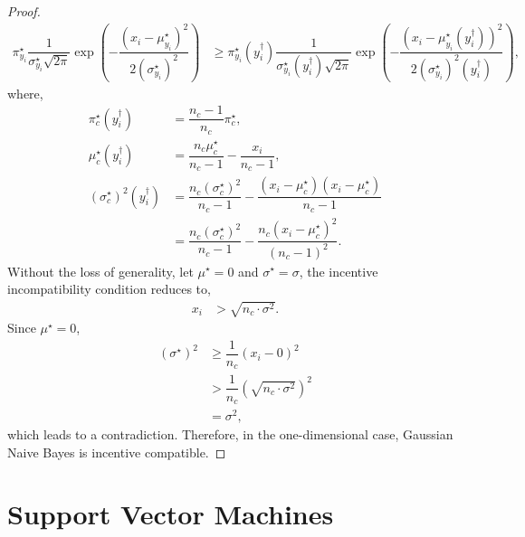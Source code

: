 \documentclass{article}
\begin{document}
\begin{proof}
\begin{align*}
\pi^\star _{y_{i}} \dfrac{1}{\sigma^\star _{y_{i}} \sqrt{2 \pi}} \exp\left(- \dfrac{\left(x_{i} - \mu^\star _{y_{i}}\right)^{2}}{2 \left(\sigma^\star _{y_{i}}\right)^{2}}\right) &\geq   \pi^\star _{y_{i}}\left(y^{\dagger}_{i}\right) \dfrac{1}{\sigma^\star _{y_{i}}\left(y^{\dagger}_{i}\right) \sqrt{2 \pi}} \exp\left(- \dfrac{\left(x_{i} - \mu^\star _{y_{i}}\left(y^{\dagger}_{i}\right)\right)^{2}}{2 \left(\sigma^\star _{y_{i}}\right)^{2}\left(y^{\dagger}_{i}\right)}\right),
\end{align*}
where,
\begin{align*}
\pi^\star _{c}\left(y^{\dagger}_{i}\right) &= \dfrac{n_{c} - 1}{n_{c}} \pi^\star _{c} ,
\\ \mu^\star _{c}\left(y^{\dagger}_{i}\right) &= \dfrac{n_{c} \mu^\star _{c}}{n_{c} - 1} - \dfrac{x_{i}}{n_{c} - 1} ,
\\ \left(\sigma^\star _{c}\right)^{2}\left(y^{\dagger}_{i}\right) &= \dfrac{n_{c} \left(\sigma^\star _{c}\right)^{2}}{n_{c} - 1} - \dfrac{\left(x_{i} - \mu^\star _{c}\right) \left(x_{i} - \mu^\star _{c}\right)}{n_{c} - 1}
\\ &= \dfrac{n_{c} \left(\sigma^\star _{c}\right)^{2}}{n_{c} - 1} - \dfrac{n_{c} \left(x_{i} - \mu^\star _{c}\right)^{2}}{\left(n_{c} - 1\right)^{2}} .
\end{align*}
Without the loss of generality, let $\mu^\star  = 0$ and $\sigma^\star  = \sigma$, the incentive incompatibility condition reduces to,
\begin{align*}
x_{i} &> \sqrt{n_{c} \cdot  \sigma^{2}}.
\end{align*}
Since $\mu^\star  = 0$,
\begin{align*}
\left(\sigma^\star \right)^{2} &\geq  \dfrac{1}{n_{c}} \left(x_{i} - 0\right)^{2}
\\ &> \dfrac{1}{n_{c}} \left(\sqrt{n_{c} \cdot  \sigma^{2}}\right)^{2}
\\ &= \sigma^{2} ,
\end{align*}
which leads to a contradiction. Therefore, in the one-dimensional case, Gaussian Naive Bayes is incentive compatible.
\newline \newline\end{proof}



\section{Support Vector Machines} 
\end{document}
